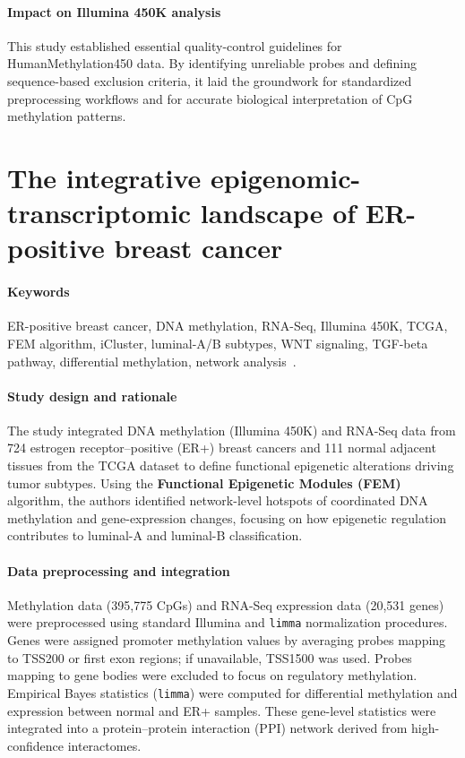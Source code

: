 \documentclass[10pt]{extarticle}
\begin{document}
\paragraph{Impact on Illumina 450K analysis}
This study established essential quality-control guidelines for HumanMethylation450 data. By identifying unreliable probes and defining sequence-based exclusion criteria, it laid the groundwork for standardized preprocessing workflows and for accurate biological interpretation of CpG methylation patterns.

\section{The integrative epigenomic-transcriptomic landscape of ER-positive breast cancer}

\paragraph{Keywords}
ER-positive breast cancer, DNA methylation, RNA-Seq, Illumina 450K, TCGA, FEM algorithm, iCluster, luminal-A/B subtypes, WNT signaling, TGF-beta pathway, differential methylation, network analysis~\cite{gao2015integrative}.

\paragraph{Study design and rationale}
The study integrated DNA methylation (Illumina 450K) and RNA-Seq data from 724 estrogen receptor–positive (ER+) breast cancers and 111 normal adjacent tissues from the TCGA dataset to define functional epigenetic alterations driving tumor subtypes. Using the \textbf{Functional Epigenetic Modules (FEM)} algorithm, the authors identified network-level hotspots of coordinated DNA methylation and gene-expression changes, focusing on how epigenetic regulation contributes to luminal-A and luminal-B classification.

\paragraph{Data preprocessing and integration}
Methylation data (395,775 CpGs) and RNA-Seq expression data (20,531 genes) were preprocessed using standard Illumina and \texttt{limma} normalization procedures. Genes were assigned promoter methylation values by averaging probes mapping to TSS200 or first exon regions; if unavailable, TSS1500 was used. Probes mapping to gene bodies were excluded to focus on regulatory methylation. Empirical Bayes statistics (\texttt{limma}) were computed for differential methylation and expression between normal and ER+ samples. These gene-level statistics were integrated into a protein–protein interaction (PPI) network derived from high-confidence interactomes.
\end{document}
